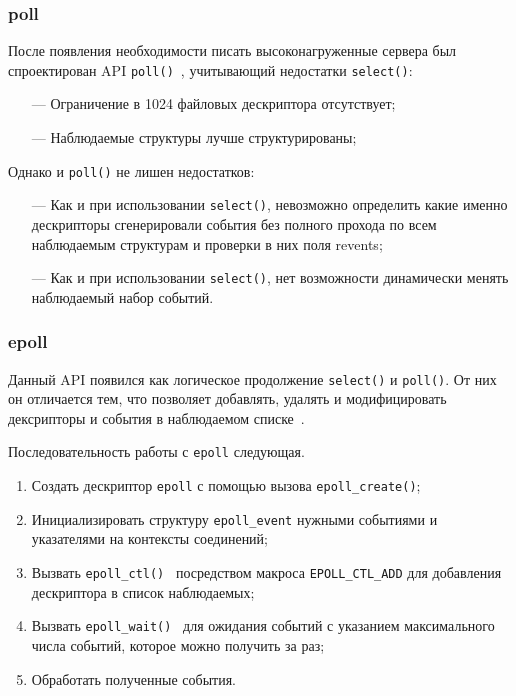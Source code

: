 \subsubsection{poll}

После появления необходимости писать высоконагруженные сервера был спроектирован API \texttt{poll()}~\cite{man-poll}, учитывающий недостатки \texttt{select()}:

\begin{itemize}
	\item[---] Ограничение в 1024 файловых дескриптора отсутствует;
	
	\item[---] Наблюдаемые структуры лучше структурированы;	
\end{itemize}

Однако и \texttt{poll()} не лишен недостатков:

\begin{itemize}
	\item[---] Как и при использовании \texttt{select()}, невозможно определить какие именно дескрипторы сгенерировали события без полного прохода по всем наблюдаемым структурам и проверки в них поля revents;
	
	\item[---] Как и при использовании \texttt{select()}, нет возможности динамически менять наблюдаемый набор событий.
\end{itemize}

\subsubsection{epoll}

Данный API появился как логическое продолжение \texttt{select()} и \texttt{poll()}. От них он отличается тем, что позволяет добавлять, удалять и модифицировать дексрипторы и события в наблюдаемом списке~\cite{man-epoll}.

Последовательность работы с \texttt{epoll} следующая.

\begin{enumerate}
	\item Создать дескриптор \texttt{epoll} с помощью вызова \texttt{epoll\_create()};
	
	\item Инициализировать структуру \texttt{epoll\_event} нужными событиями и указателями на контексты соединений;
	
	\item Вызвать \texttt{epoll\_ctl()}~\cite{man-epoll-ctl} посредством макроса \texttt{EPOLL\_CTL\_ADD} для добавления дескриптора в список наблюдаемых;
	
	\item Вызвать \texttt{epoll\_wait()}~\cite{man-epoll-wait} для ожидания событий с указанием максимального числа событий, которое можно получить за раз;
	
	\item Обработать полученные события.
\end{enumerate}

